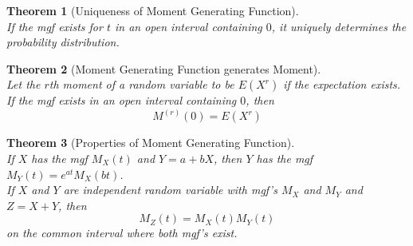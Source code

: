 \documentclass[12pt]{article}
\newtheorem{theorem}{Theorem}[section]
\theoremstyle{definition}
\begin{document}
\begin{theorem}[Uniqueness of Moment Generating Function]
\hfill\\\normalfont If the mgf exists for $t$ in an open interval containing $0$, it uniquely determines the probability distribution.
\end{theorem}
\begin{theorem}[Moment Generating Function generates Moment]
\hfill\\\normalfont Let the $r$th moment of a random variable to be $E(X^r)$ if the expectation exists. If the mgf exists in an open interval containing $0$, then 
\[
M^{(r)}(0) = E(X^r)
\]
\end{theorem}
\begin{theorem}[Properties of Moment Generating Function]
\hfill\\\normalfont If $X$ has the mgf $M_X(t)$ and $Y=a+bX$, then $Y$ has the mgf $M_Y(t) = e^{at}M_X(bt)$.\\

If $X$ and $Y$ are independent random variable with mgf's $M_X$ and $M_Y$ and $Z=X+Y$, then
\[
M_Z(t) = M_X(t)M_Y(t)
\]
on the common interval where both mgf's exist.
\end{theorem}
\end{document}
